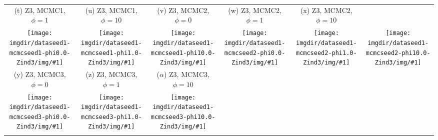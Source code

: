 {\begin{tabular}{cccccc}
    {\tiny (t) Z3, MCMC1, $\phi=1$} &
    {\tiny (u) Z3, MCMC1, $\phi=10$} &
    {\tiny (v) Z3, MCMC2, $\phi=0$} &
    {\tiny (w) Z3, MCMC2, $\phi=1$} &
    {\tiny (x) Z3, MCMC2, $\phi=10$} \\
    \texttt{[image: \\imgdir/dataseed1-mcmcseed1-phi0.0-Zind3/img/\#1]} &
    \texttt{[image: \\imgdir/dataseed1-mcmcseed1-phi1.0-Zind3/img/\#1]} &
    \texttt{[image: \\imgdir/dataseed1-mcmcseed1-phi10.0-Zind3/img/\#1]} &
    \texttt{[image: \\imgdir/dataseed1-mcmcseed2-phi0.0-Zind3/img/\#1]} &
    \texttt{[image: \\imgdir/dataseed1-mcmcseed2-phi1.0-Zind3/img/\#1]} &
    \texttt{[image: \\imgdir/dataseed1-mcmcseed2-phi10.0-Zind3/img/\#1]} \\
    {\tiny (y) Z3, MCMC3, $\phi=0$} &
    {\tiny (z) Z3, MCMC3, $\phi=1$} &
    {\tiny ($\alpha$) Z3, MCMC3, $\phi=10$} &
    & & \\
    \texttt{[image: \\imgdir/dataseed1-mcmcseed3-phi0.0-Zind3/img/\#1]} &
    \texttt{[image: \\imgdir/dataseed1-mcmcseed3-phi1.0-Zind3/img/\#1]} &
    \texttt{[image: \\imgdir/dataseed1-mcmcseed3-phi10.0-Zind3/img/\#1]} \\
    & & \\
  \end{tabular}
}
